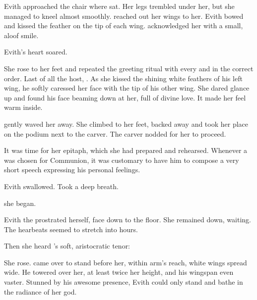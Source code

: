 Evith approached the chair where \Urizeth sat.
Her legs trembled under her, but she managed to kneel almost smoothly.
\Urizeth reached out her wings to her. 
Evith bowed and kissed the feather on the tip of each wing. 
\Urizeth acknowledged her with a small, aloof smile. 

Evith's heart soared. 

She rose to her feet and repeated the greeting ritual with every \resphan and \resvil in the correct order. 
Last of all the host, \Teshrial. 
As she kissed the shining white feathers of his left wing, he softly caressed her face with the tip of his other wing. 
She dared glance up and found his face beaming down at her, full of divine love. 
It made her feel warm inside. 


\Teshrial gently waved her away.
She climbed to her feet, backed away and took her place on the podium next to the carver.
The carver nodded for her to proceed. 


It was time for her epitaph, which she had prepared and rehearsed. 
Whenever a \naor \human was chosen for Communion, it was customary to have him to compose a very short speech expressing his personal feelings. 

Evith swallowed.
Took a deep breath.

 she began.

Evith the prostrated herself, face down to the floor.
She remained down, waiting. 
The hearbeats seemed to stretch into hours. 


Then she heard \Teshrial's soft, aristocratic tenor: 

She rose. 
\Teshrial came over to stand before her, within arm's reach, white wings spread wide. 
He towered over her, at least twice her height, and his wingspan even vaster. 
Stunned by his awesome presence, Evith could only stand and bathe in the radiance of her god. 

